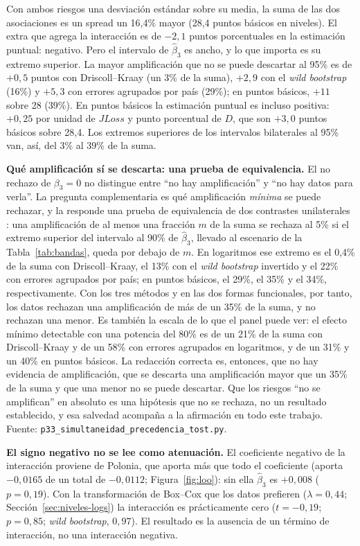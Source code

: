 Con ambos riesgos una desviación estándar sobre su media, la suma de las dos asociaciones es un spread un 16,4\% mayor (28,4 puntos básicos en niveles). El extra que agrega la interacción es de $-2{,}1$ puntos porcentuales en la estimación puntual: negativo. Pero el intervalo de $\hat\beta_3$ es ancho, y lo que importa es su extremo superior. La mayor amplificación que no se puede descartar al 95\% es de $+0{,}5$ puntos con Driscoll--Kraay (un 3\% de la suma), $+2{,}9$ con el \textit{wild bootstrap} (16\%) y $+5{,}3$ con errores agrupados por país (29\%); en puntos básicos, $+11$ sobre 28 (39\%). En puntos básicos la estimación puntual es incluso positiva: $+0{,}25$ por unidad de $JLoss$ y punto porcentual de $D$, que son $+3{,}0$ puntos básicos sobre 28,4. Los extremos superiores de los intervalos bilaterales al 95\% van, así, del 3\% al 39\% de la suma.

\textbf{Qué amplificación sí se descarta: una prueba de equivalencia.} El no rechazo de $\beta_3=0$ no distingue entre ``no hay amplificación'' y ``no hay datos para verla''. La pregunta complementaria es qué amplificación \emph{mínima} se puede rechazar, y la responde una prueba de equivalencia de dos contrastes unilaterales \citep[TOST;][]{Schuirmann1987}: una amplificación de al menos una fracción $m$ de la suma se rechaza al 5\% si el extremo superior del intervalo al 90\% de $\hat\beta_3$, llevado al escenario de la Tabla~\ref{tab:bandas}, queda por debajo de $m$. En logaritmos ese extremo es el 0,4\% de la suma con Driscoll--Kraay, el 13\% con el \textit{wild bootstrap} invertido y el 22\% con errores agrupados por país; en puntos básicos, el 29\%, el 35\% y el 34\%, respectivamente. Con los tres métodos y en las dos formas funcionales, por tanto, los datos rechazan una amplificación de más de un 35\% de la suma, y no rechazan una menor. Es también la escala de lo que el panel puede ver: el efecto mínimo detectable con una potencia del 80\% es de un 21\% de la suma con Driscoll--Kraay y de un 58\% con errores agrupados en logaritmos, y de un 31\% y un 40\% en puntos básicos. La redacción correcta es, entonces, que no hay evidencia de amplificación, que se descarta una amplificación mayor que un 35\% de la suma y que una menor no se puede descartar. Que los riesgos ``no se amplifican'' en absoluto es una hipótesis que no se rechaza, no un resultado establecido, y esa salvedad acompaña a la afirmación en todo este trabajo. Fuente: \texttt{p33\_simultaneidad\_precedencia\_tost.py}.

\textbf{El signo negativo no se lee como atenuación.} El coeficiente negativo de la interacción proviene de Polonia, que aporta más que todo el coeficiente (aporta $-0{,}0165$ de un total de $-0{,}0112$; Figura~\ref{fig:loo}): sin ella $\hat\beta_3$ es $+0{,}008$ ($p=0{,}19$). Con la transformación de Box--Cox que los datos prefieren ($\lambda=0{,}44$; Sección~\ref{sec:niveles-logs}) la interacción es prácticamente cero ($t=-0{,}19$; $p=0{,}85$; \textit{wild bootstrap}, $0{,}97$). El resultado es la ausencia de un término de interacción, no una interacción negativa.

